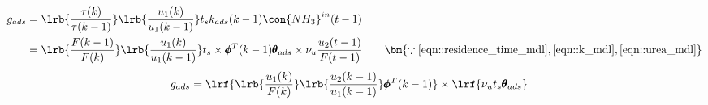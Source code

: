 \begin{align*}
        g_{ads} &= \lrb{\frac{\tau(k)}{\tau(k-1)}}
                                \lrb{\frac{u_1(k)}{u_1(k-1)}}
                t_s k_{ads}(k-1) \con{NH_3}^{in}(t-1)\\
        &=\lrb{\frac{F(k-1)}{F(k)}}\lrb{\frac{u_1(k)}{u_1(k-1)}}
                t_s \times \pmb \phi^T(k-1) \pmb \theta_{ads} \times \nu_u \frac{u_2(t-1)}{F(t-1)}
                \qquad
                \bm{\because \ref{eqn::residence_time_mdl}, \ref{eqn::k_mdl}, \ref{eqn::urea_mdl}}
\end{align*}
\begin{align}
       g_{ads} &=  \lrf{\lrb{\frac{u_1(k)}{F(k)}}\lrb{\frac{u_2(k-1)}{u_1(k-1)}} \pmb \phi^T(k-1) }
                \times \lrf{\nu_u t_s \pmb \theta_{ads}}
\end{align}
